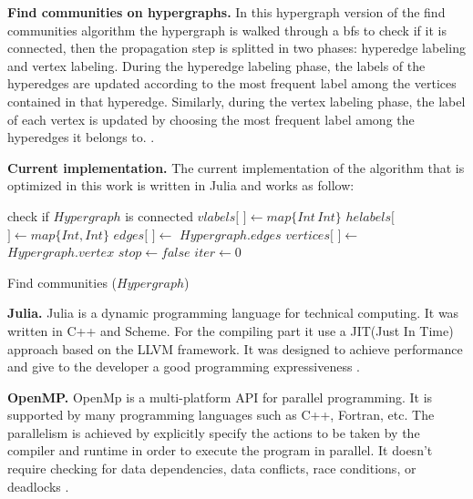 \documentclass[conference]{IEEEtran}
\newcommand{\mypar}[1]{{\bf #1.}}
\begin{document}
\mypar{Find communities on hypergraphs}
In this hypergraph version of the find communities algorithm the hypergraph is walked through a bfs to check if it is connected, then the propagation step is splitted in two phases: hyperedge labeling and vertex labeling. During the hyperedge labeling phase, the labels of the
hyperedges are updated according to the most frequent label among the vertices contained in that hyperedge. Similarly, during the vertex labeling phase, the label of each vertex is updated by choosing the most frequent label among the hyperedges it belongs to. \cite{SimpleHypergraphs}.

\mypar{Current implementation}
The current implementation of the algorithm that is optimized in this work is written in Julia and works as follow:
\begin{algorithm}[h]
\label{alg:find_communities}
\SetAlgoLined
{}
    check if $Hypergraph$ is connected\;
    $vlabels[$ $] \gets map\{Int\,Int\}$\;
    $helabels[$ $] \gets map\{Int,Int\}$\;
    $edges[$ $] \gets$ $Hypergraph.edges$\;
    $vertices[$ $] \gets$ $Hypergraph.vertex$\;
    $stop \gets false$\;
    $iter \gets 0$\;
    \caption{Find communities ($Hypergraph$)}
\end{algorithm}

\mypar{Julia}
Julia is a dynamic programming language for technical computing. It was written in C++ and Scheme. For the compiling part it use a JIT(Just In Time) approach based on the LLVM framework. It was designed to achieve performance and give to the developer a good programming expressiveness \cite{Julia}.

\mypar{OpenMP}
OpenMp is a multi-platform API for parallel programming. It is supported by many programming languages such as C++, Fortran, etc. The parallelism is achieved by explicitly specify the actions to be taken by the compiler and runtime in order to execute the program in parallel. It doesn't require checking for data dependencies, data conflicts, race conditions, or deadlocks \cite{OpenMp}.
\end{document}

